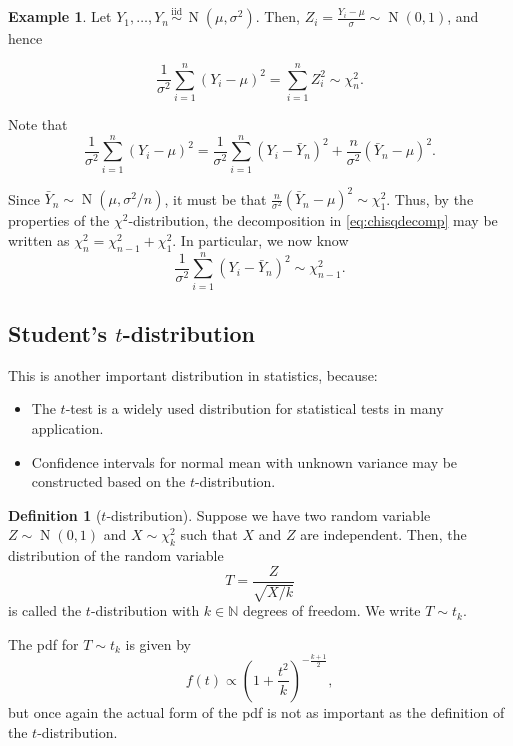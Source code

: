 \documentclass[
]{book}
\providecommand{\tightlist}{%
  \setlength{\itemsep}{0pt}\setlength{\parskip}{0pt}}
\DeclareMathOperator{\N}{N}
\newcommand{\iid}{\,\overset{\text{iid}}{\sim}\,}
\newcommand{\bbN}{\mathbb{N}}
\theoremstyle{definition}
\newtheorem{definition}{Definition}[chapter]
\theoremstyle{definition}
\newtheorem{example}{Example}[chapter]
\theoremstyle{definition}
\theoremstyle{definition}
\theoremstyle{remark}
\begin{document}
\begin{example}
Let \(Y_1,\dots,Y_n\iid \N(\mu,\sigma^2)\).
Then, \(Z_i = \frac{Y_i-\mu}{\sigma} \sim \N(0,1)\), and hence

\[\frac{1}{\sigma^2} \sum_{i=1}^n (Y_i-\mu)^2 = \sum_{i=1}^n Z_i^2 \sim \chi^2_n .\]

Note that
\begin{equation}
    \frac{1}{\sigma^2} \sum_{i=1}^n (Y_i-\mu)^2
    = \frac{1}{\sigma^2} \sum_{i=1}^n (Y_i-\bar Y_n)^2 +  \frac{n}{\sigma^2} (\bar Y_n -\mu)^2. \label{eq:chisqdecomp}
\end{equation}

Since \(\bar Y_n \sim \N(\mu, \sigma^2/n)\), it must be that
\(\frac{n}{\sigma^2} (\bar Y_n -\mu)^2 \sim \chi^2_1\).
Thus, by the properties of the \(\chi^2\)-distribution, the decomposition in \eqref{eq:chisqdecomp} may be written as
\(\chi^2_n = \chi^2_{n-1} + \chi^2_{1}\).
In particular, we now know
\[\frac{1}{\sigma^2} \sum_{i=1}^n (Y_i-\bar Y_n)^2 \sim \chi^2_{n-1} .\]
\end{example}

\hypertarget{students-t-distribution}{%
\subsection{\texorpdfstring{Student's \(t\)-distribution}{Student's t-distribution}}\label{students-t-distribution}}

This is another important distribution in
statistics, because:

\begin{itemize}
\tightlist
\item
  The \(t\)-test is a widely used distribution for statistical tests in many
  application.
\item
  Confidence intervals for normal mean with unknown variance may be
  constructed based on the \(t\)-distribution.
\end{itemize}

\begin{definition}[\(t\)-distribution]
Suppose we have two random variable \(Z\sim\N(0,1)\) and \(X\sim\chi^2_k\) such that \(X\) and \(Z\) are independent.
Then, the distribution of the random variable
\[T = \frac{Z}{\sqrt{X/k}}\] is called the \(t\)-distribution with \(k\in\bbN\)
degrees of freedom. We write \(T\sim t_k\).
\end{definition}

The pdf for \(T \sim t_k\) is given by
\[f(t) \propto \left(1 + \frac{t^2}{k} \right)^{-\frac{k+1}{2}},\] but
once again the actual form of the pdf is not as important as the
definition of the \(t\)-distribution.
\end{document}
